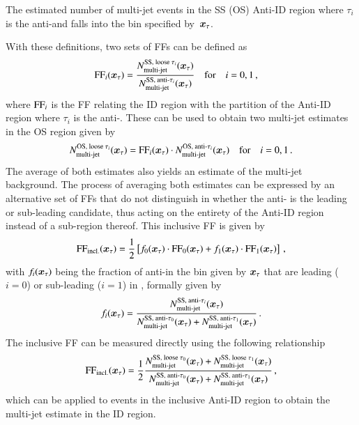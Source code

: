 {\begin{description}[style=standard]
  \item[$\NmjAntiID{SS(OS)}{i}\ffargs$] The estimated number of
    multi-jet events in the SS (OS) Anti-ID region where $\tau_i$ is
    the anti-\tauhadvis and falls into the bin specified
    by~$\bm{x}_\tau$.
  \end{description}
  With these definitions, two sets of FFs can be defined as
  \begin{align*}
    \text{FF}_{i}( \bm{x}_{\tau} ) &= \frac{N_\text{multi-jet}^{\text{SS, loose }\tau_{i}} ( \bm{x}_{\tau} )}{N_\text{multi-jet}^{\text{SS, anti-}\tau_{i}}( \bm{x}_{\tau} )}
                     \quad \text{for} \quad i = 0, 1 \,\text{,}
  \end{align*}
  where $\text{FF}_{i}$ is the FF relating the ID region with the partition of the
  Anti-ID region where $\tau_i$ is the anti-\tauhadvis. These can be used to
  obtain two multi-jet estimates in the OS region given by
  \begin{align*}
    N_\text{multi-jet}^{\text{OS, loose }\tau_{i}}( \bm{x}_{\tau} ) = \text{FF}_{i}( \bm{x}_{\tau} ) \cdot N_\text{multi-jet}^{\text{OS, anti-}\tau_{i}}( \bm{x}_{\tau} )
    \quad \text{for} \quad i = 0, 1 \,\text{.}
  \end{align*}
  The average of both estimates also yields an estimate of the multi-jet
  background. The process of averaging both estimates can be expressed by an
  alternative set of FFs that do not distinguish in whether the anti-\tauhadvis
  is the leading or sub-leading \tauhadvis candidate, thus acting on the
  entirety of the Anti-ID region instead of a sub-region thereof. This inclusive
  FF is given by
  \begin{align*}
    \text{FF}_\text{incl.}( \bm{x}_{\tau} ) = \frac{1}{2} \left[ f_0( \bm{x}_{\tau} ) \cdot \text{FF}_0( \bm{x}_{\tau} )
    + f_1( \bm{x}_{\tau} ) \cdot \text{FF}_1( \bm{x}_{\tau} ) \right] \,\text{,}
  \end{align*}
  with $f_i( \bm{x}_{\tau} )$ being the fraction of anti-\tauhadvis in the bin
  given by $\bm{x}_\tau$ that are leading ($i = 0$) or sub-leading
  ($i = 1$) in \pT, formally given by
  \begin{align*}
    f_i( \bm{x}_{\tau} ) = \frac{N_\text{multi-jet}^{\text{SS, anti-}\tau_{i}}( \bm{x}_{\tau} )}
                      {N_\text{multi-jet}^{\text{SS, anti-}\tau_{0}}( \bm{x}_{\tau} ) + N_\text{multi-jet}^{\text{SS, anti-}\tau_{1}}( \bm{x}_{\tau} )} \,\text{.}
  \end{align*}
  The inclusive FF can be measured directly using the following relationship
  \begin{align}
    \text{FF}_\text{incl.}( \bm{x}_{\tau} )
    = \frac{1}{2} \frac{ N_\text{multi-jet}^{\text{SS, loose }\tau_{0}}( \bm{x}_{\tau} ) + N_\text{multi-jet}^{\text{SS, loose }\tau_{1}}( \bm{x}_{\tau} ) }
                       { N_\text{multi-jet}^{\text{SS, anti-}\tau_{0}}( \bm{x}_{\tau} ) + N_\text{multi-jet}^{\text{SS, anti-}\tau_{1}}( \bm{x}_{\tau} ) } \,\text{,}
    \label{eq:inclusive_fake_factor}
  \end{align}
  which can be applied to events in the inclusive Anti-ID region to
  obtain the multi-jet estimate in the ID region.

}
